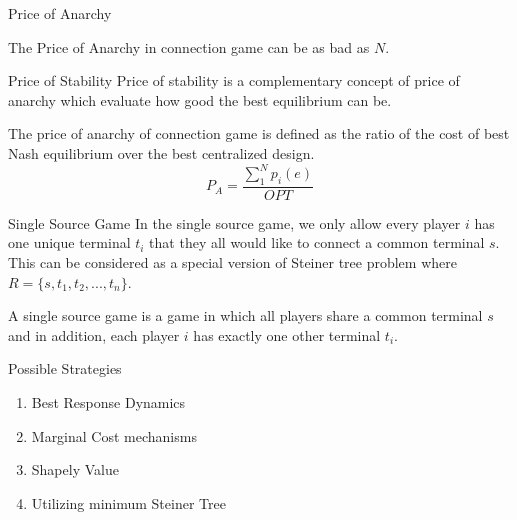 \documentclass[11pt,aspectratio=169]{beamer}
\begin{document}
\begin{frame}{Price of Anarchy}
    \begin{lemma}
        The Price of Anarchy in connection game can be as bad as \(N\).
    \end{lemma}
    \vspace{10pt}
    \centering
\end{frame}

\begin{frame}{Price of Stability}
    Price of stability is a complementary concept of price of anarchy which evaluate how good the best equilibrium can be. 

\begin{definition} 
    The price of anarchy of connection game is defined as the ratio of the cost of best Nash equilibrium over the best centralized design.
    \[P_A = \dfrac{\sum_{1}^{N}p_i(e) }{OPT}\]
    \end{definition}
\end{frame}

\begin{frame}{Single Source Game}
    In the single source game, we only allow every player \(i\) has one unique terminal \(t_i\) that they all would like to connect a common terminal \(s\). This can be considered as a special version of Steiner tree problem where \(R = \{s,t_1,t_2,...,t_n\}\). 
\vspace{10pt}
\begin{definition}
	A single source game is a game in which all players share a common terminal \(s\) and in addition, each player \(i\) has exactly one other terminal \(t_i\).
\end{definition}
\end{frame}

\begin{frame}{Possible Strategies}
    \begin{enumerate}
        \item Best Response Dynamics 
        \item Marginal Cost mechanisms
        \item Shapely Value 
        \item Utilizing minimum Steiner Tree
    \end{enumerate}
\end{frame}
\end{document}
